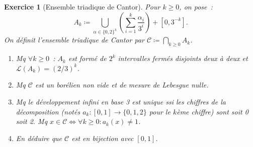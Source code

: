 \documentclass{article}
\newtheorem{ex}{Exercice}[section]
\begin{document}
\begin{ex}[Ensemble triadique de Cantor] Pour $k \geq 0$, on pose~:
\[A_k \coloneqq \bigcup_{\alpha \in \{0, 2\}^k}\left(\sum_{i=1}^k\frac {\alpha_i}{3^i}\right) + [0, 3^{-k}].\]
On définit l'\textit{ensemble triadique de Cantor} par $\mathscr C \coloneqq \bigcap_{k \geq 0}A_k$.
\begin{enumerate}
	\item Mq $\forall k \geq 0$~: $A_k$ est formé de $2^k$ intervalles fermés disjoints deux à deux et $\mathcal L(A_k) = (2/3)^k$.
	\item Mq $\mathscr C$ est un borélien non vide et de mesure de Lebesgue nulle.
	\item Mq le développement infini en base 3 est unique ssi les chiffres de la décomposition (notés $a_k : [0, 1] \to \{0, 1, 2\}$ pour le $k$ème chiffre)
	sont soit 0 soit 2. Mq $x \in \mathscr C \iff \forall k \geq 0 : a_k(x) \neq 1$.
	\item En déduire que $\mathscr C$ est en bijection avec $[0, 1]$.
\end{enumerate}
\end{ex}
\end{document}
